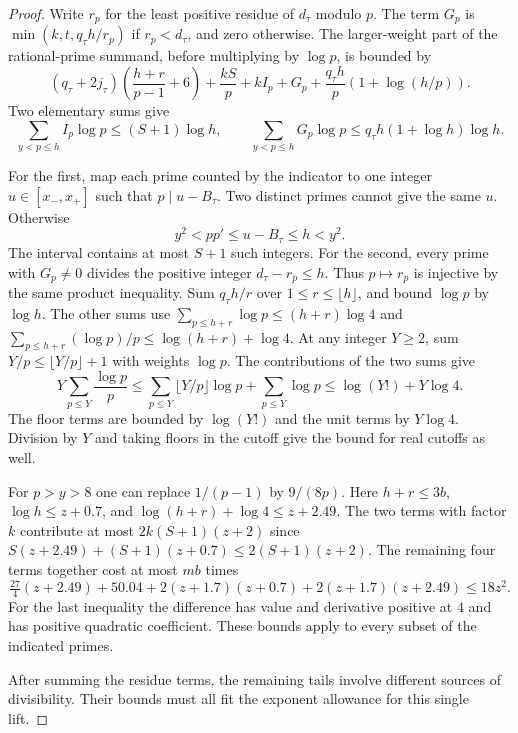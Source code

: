 \begin{proof}
Write \(r_p\) for the least positive residue of \(d_\tau\) modulo
\(p\). The term \(G_p\) is \(\min(k,t,q_\tau h/r_p)\) if
\(r_p<d_\tau\), and zero otherwise. The larger-weight
part of the rational-prime summand, before multiplying by
\(\log p\), is bounded by
\[
 (q_\tau+2j_\tau)\left(\frac{h+r}{p-1}+6\right)
   +\frac{kS}{p}+k I_p+G_p
   +\frac{q_\tau h}{p}(1+\log(h/p)).
\]
Two elementary sums give
\[
 \sum_{y<p\le h} I_p\log p\le(S+1)\log h,\qquad
 \sum_{y<p\le h} G_p\log p\le q_\tau h(1+\log h)\log h.
\]

For the first, map each prime counted by the indicator to one
integer \(u\in[x_-,x_+]\) such that \(p\mid u-B_\tau\). Two distinct primes cannot give the same \(u\). Otherwise
\[
 y^2<pp'\le u-B_\tau\le h<y^2 .
\] The interval contains at most \(S+1\) such integers.
For the second, every prime with \(G_p\ne0\) divides the positive
integer \(d_\tau-r_p\le h\). Thus \(p\mapsto r_p\) is injective
by the same product inequality. Sum \(q_\tau h/r\) over
\(1\le r\le\lfloor h\rfloor\), and bound \(\log p\) by \(\log h\).
\label{cor:lift-exponent-primes-4}
The other sums use \(\sum_{p\le h+r}\log p\le(h+r)\log4\)
and \(\sum_{p\le h+r}(\log p)/p\le\log(h+r)+\log4\).
At any integer \(Y\ge2\), sum \(Y/p\le\lfloor Y/p\rfloor+1\) with weights \(\log p\). The contributions of the two sums give
\[
 Y\sum_{p\le Y}\frac{\log p}{p}\le \sum_{p\le Y}\lfloor Y/p\rfloor\log p+\sum_{p\le Y}\log p\le\log(Y!)+Y\log4 .
\]
The floor terms are bounded by \(\log(Y!)\) and the unit terms
by \(Y\log4\). Division by \(Y\) and taking floors in the
cutoff give the bound for real cutoffs as well.

For \(p>y>8\) one can replace \(1/(p-1)\) by \(9/(8p)\).
Here \(h+r\le3b\), \(\log h\le z+0.7\), and
\(\log(h+r)+\log4\le z+2.49\). The two terms with factor
\(k\) contribute at most \(2k(S+1)(z+2)\) since
\(S(z+2.49)+(S+1)(z+0.7)\le2(S+1)(z+2)\).
The remaining four terms together cost at most \(mb\) times
\[
 \tfrac{27}{4}(z+2.49)+50.04
   +2(z+1.7)(z+0.7)+2(z+1.7)(z+2.49)\le18z^2.
\]
For the last inequality the difference has value and derivative
positive at \(4\) and has positive quadratic coefficient.
These bounds apply to every subset of the indicated primes.

After summing the residue terms, the remaining tails involve different sources of divisibility. Their bounds must all fit the exponent allowance for this single lift.


\end{proof}
